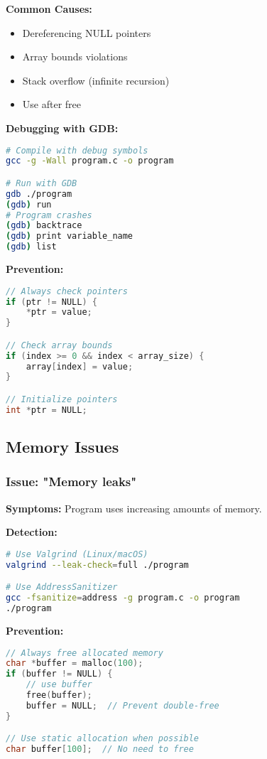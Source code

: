 \documentclass[11pt,a4paper]{article}
\begin{document}
\textbf{Common Causes:}
\begin{itemize}
    \item Dereferencing NULL pointers
    \item Array bounds violations
    \item Stack overflow (infinite recursion)
    \item Use after free
\end{itemize}

\textbf{Debugging with GDB:}
\begin{lstlisting}[language=bash]
# Compile with debug symbols
gcc -g -Wall program.c -o program

# Run with GDB
gdb ./program
(gdb) run
# Program crashes
(gdb) backtrace
(gdb) print variable_name
(gdb) list
\end{lstlisting}

\textbf{Prevention:}
\begin{lstlisting}[language=c]
// Always check pointers
if (ptr != NULL) {
    *ptr = value;
}

// Check array bounds
if (index >= 0 && index < array_size) {
    array[index] = value;
}

// Initialize pointers
int *ptr = NULL;
\end{lstlisting}

\subsection{Memory Issues}

\subsubsection{Issue: "Memory leaks"}
\textbf{Symptoms:} Program uses increasing amounts of memory.

\textbf{Detection:}
\begin{lstlisting}[language=bash]
# Use Valgrind (Linux/macOS)
valgrind --leak-check=full ./program

# Use AddressSanitizer
gcc -fsanitize=address -g program.c -o program
./program
\end{lstlisting}

\textbf{Prevention:}
\begin{lstlisting}[language=c]
// Always free allocated memory
char *buffer = malloc(100);
if (buffer != NULL) {
    // use buffer
    free(buffer);
    buffer = NULL;  // Prevent double-free
}

// Use static allocation when possible
char buffer[100];  // No need to free
\end{lstlisting}
\end{document}
